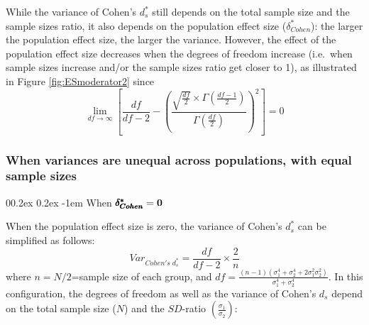 \documentclass[
  english,
  man]{apa6}
\makeatletter
\let\oldparagraph\paragraph
\renewcommand{\paragraph}[1]{\oldparagraph{#1}\mbox{}}
\renewcommand{\paragraph}{\@startsection{paragraph}{4}{\parindent}%
  {0\baselineskip \@plus 0.2ex \@minus 0.2ex}%
  {-1em}%
  {\normalfont\normalsize\bfseries\itshape\typesectitle}}
\makeatother
\begin{document}
While the variance of Cohen's \(d^*_s\) still depends on the total sample size and the sample sizes ratio, it also depends on the population effect size (\(\delta^*_{Cohen}\)): the larger the population effect size, the larger the variance. However, the effect of the population effect size decreases when the degrees of freedom increase (i.e.~when sample sizes increase and/or the sample sizes ratio get closer to 1), as illustrated in Figure \ref{fig:ESmoderator2} since
\[\lim_{df\rightarrow \infty}\left[\frac{df}{df-2} - \left( \frac{\sqrt{\frac{df}{2}} \times \Gamma \left(\frac{df-1}{2} \right)}{\Gamma \left( \frac{df}{2}\right)}\right)^2 \right]=0\]

\hypertarget{when-variances-are-unequal-across-populations-with-equal-sample-sizes-1}{%
\subsubsection{When variances are unequal across populations, with equal sample sizes}\label{when-variances-are-unequal-across-populations-with-equal-sample-sizes-1}}

\hypertarget{when-bf-pmbdelta_cohen0-2}{%
\paragraph{\texorpdfstring{When \(\bf \pmb{\delta^*_{Cohen}}=0\)}{When \textbackslash bf \textbackslash pmb\{\textbackslash delta\^{}*\_\{Cohen\}\}=0}}\label{when-bf-pmbdelta_cohen0-2}}

When the population effect size is zero, the variance of Cohen's \(d^*_s\) can be simplified as follows:
\[Var_{Cohen's \; d^*_s} = \frac{df}{df-2} \times \frac{2}{n}\]
where \(n=N/2\)=sample size of each group, and \(df=\frac{(n-1)(\sigma^4_1+\sigma^4_2+2\sigma^2_1\sigma^2_2)}{\sigma^4_1+\sigma^4_2}\). In this configuration, the degrees of freedom as well as the variance of Cohen's \(d_s\) depend on the total sample size (\(N\)) and the \(SD\)-ratio \(\left( \frac{\sigma_1}{\sigma_2}\right)\):
\end{document}
